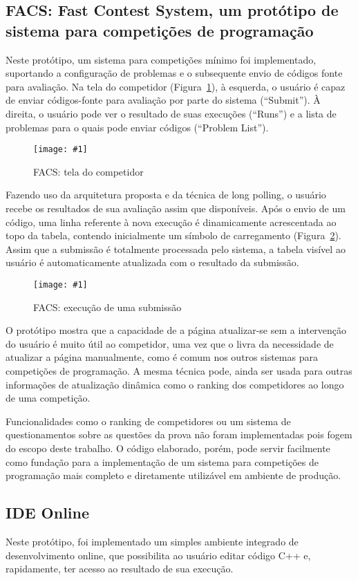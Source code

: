 \documentclass[ruledheader, 12pt]{abnt}
\newcommand{\figcustom}[4]{\par
	\begin{figure}[#3]
		\centering
		\texttt{[image: \#1]}
		\caption{\label{fig:#1}#2}
	\end{figure}
\par}
\newcommand{\fig}[2]{\figcustom{#1}{#2}{bp}{1}}
\newcommand{\figref}[1]{(Figura~\ref{fig:#1})}
\begin{document}
\subsection{FACS: Fast Contest System, um protótipo de sistema para competições de programação}

Neste protótipo, um sistema para competições mínimo foi implementado, suportando a configuração de problemas e o subsequente envio de códigos fonte para avaliação. Na tela do competidor \figref{facs}, à esquerda, o usuário é capaz de enviar códigos-fonte para avaliação por parte do sistema (``Submit''). À direita, o usuário pode ver o resultado de suas execuções (``Runs'') e a lista de problemas para o quais pode enviar códigos (``Problem List'').

\fig{facs}{FACS: tela do competidor}

Fazendo uso da arquitetura proposta e da técnica de long polling, o usuário recebe os resultados de sua avaliação assim que disponíveis. Após o envio de um código, uma linha referente à nova execução é dinamicamente acrescentada ao topo da tabela, contendo inicialmente um símbolo de carregamento \figref{facs-running}. Assim que a submissão é totalmente processada pelo sistema, a tabela visível ao usuário é automaticamente atualizada com o resultado da submissão.

\figcustom{facs-running}{FACS: execução de uma submissão}{bp}{1}

O protótipo mostra que a capacidade de a página atualizar-se sem a intervenção do usuário é muito útil ao competidor, uma vez que o livra da necessidade de atualizar a página manualmente, como é comum nos outros sistemas para competições de programação. A mesma técnica pode, ainda ser usada para outras informações de atualização dinâmica como o ranking dos competidores ao longo de uma competição.

Funcionalidades como o ranking de competidores ou um sistema de questionamentos sobre as questões da prova não foram implementadas pois fogem do escopo deste trabalho. O código elaborado, porém, pode servir facilmente como fundação para a implementação de um sistema para competições de programação mais completo e diretamente utilizável em ambiente de produção.

\subsection{IDE Online}

Neste protótipo, foi implementado um simples ambiente integrado de desenvolvimento online, que possibilita ao usuário editar código C++ e, rapidamente, ter acesso ao resultado de sua execução.
\end{document}
